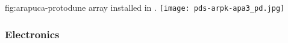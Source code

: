 
\begin{dunefigure}{fig:arapuca-protodune}
{ array installed in .} 
\texttt{[image: pds-arpk-apa3\_pd.jpg]} 
\end{dunefigure}


\subsubsection{ Electronics}
\label{sec:ssp-protodune-electronics}



